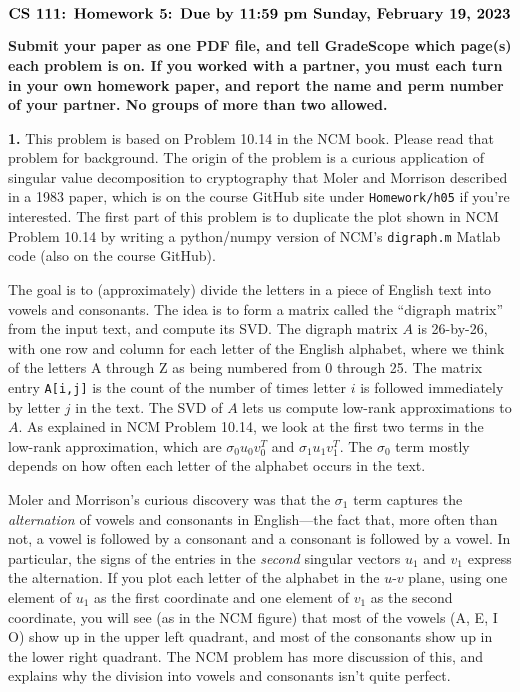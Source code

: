 \documentclass[11pt]{article}
\begin{document}
$$\mbox{\Large \bf CS 111: Homework 5: Due by 11:59 pm Sunday, February 19, 2023}$$
\par\smallskip\noindent
{\bf Submit your paper as one PDF file,
and tell GradeScope which page(s) each problem is on.
If you worked with a partner, you must each turn in your own 
homework paper, and report the name and perm number of your partner.
No groups of more than two allowed.
}

\par\bigskip
{\bf 1.} 
This problem is based on Problem 10.14 in the NCM book.
Please read that problem for background.
The origin of the problem is a curious application of singular value decomposition
to cryptography that Moler and Morrison described in a 1983 paper,
which is on the course GitHub site under {\tt Homework/h05} if you're interested.
The first part of this problem is to duplicate the plot shown in NCM Problem 10.14
by writing a python/numpy version of NCM's {\tt digraph.m} Matlab code 
(also on the course GitHub).

The goal is to (approximately) divide the letters in a piece of English text 
into vowels and consonants.
The idea is to form a matrix called the ``digraph matrix'' from the input text,
and compute its SVD.
The digraph matrix $A$ is 26-by-26, with one row and column for each letter of the
English alphabet,
where we think of the letters A through Z as being numbered from 0 through 25.
The matrix entry {\tt A[i,j]} is the count of the number of times letter $i$
is followed immediately by letter $j$ in the text.
The SVD of $A$ lets us compute low-rank approximations to $A$.
As explained in NCM Problem 10.14, 
we look at the first two terms in the low-rank approximation, 
which are $\sigma_0u_0v_0^T$ and $\sigma_1u_1v_1^T$.
The $\sigma_0$ term mostly depends on how often each letter of the alphabet occurs in the text.

Moler and Morrison's curious discovery was
that the $\sigma_1$ term captures the {\em alternation} of vowels and consonants in English---the
fact that, more often than not, 
a vowel is followed by a consonant and a consonant is followed by a vowel.
In particular, the signs of the entries in the {\em second} singular vectors $u_1$ and $v_1$ 
express the alternation.
If you plot each letter of the alphabet in the $u$-$v$ plane,
using one element of $u_1$ as the first coordinate and one element of $v_1$
as the second coordinate,
you will see (as in the NCM figure) that most of the vowels (A, E, I O) show up in the
upper left quadrant, and most of the consonants show up in the lower right quadrant.
The NCM problem has more discussion of this, and explains why the division into
vowels and consonants isn't quite perfect.
\end{document}
